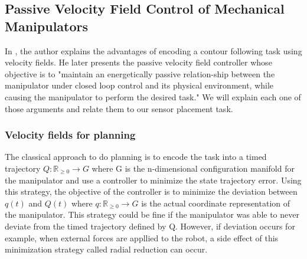 \subsection{Passive Velocity Field Control of Mechanical Manipulators}
In \cite{li1999passive}, the author explains the advantages of encoding a contour following task using velocity fields. 
He later presents the passive velocity field controller whose objective is to "maintain an energetically passive relation-ship between the manipulator under closed loop control and
its physical environment, while causing the manipulator to perform the desired task." 
We will explain each one of those arguments and relate them to our sensor placement task.
\subsubsection{Velocity fields for planning}
The classical approach to do planning is to encode the task into a timed trajectory $Q:\mathbb R_{\ge 0} \rightarrow G$ where G is the n-dimensional configuration manifold for the manipulator and use a controller to minimize the state trajectory error.
Using this strategy, the objective of the controller is to minimize the deviation between $q(t)$ and $Q(t)$ where $q:\mathbb R_{\ge 0} \rightarrow G$ is the actual coordinate representation of the manipulator.
This strategy could be fine if the manipulator was able to never deviate from the timed trajectory defined by Q. However, if deviation occurs for example, when external forces are appllied to the
robot, a side effect of this minimization strategy called radial reduction can occur.


